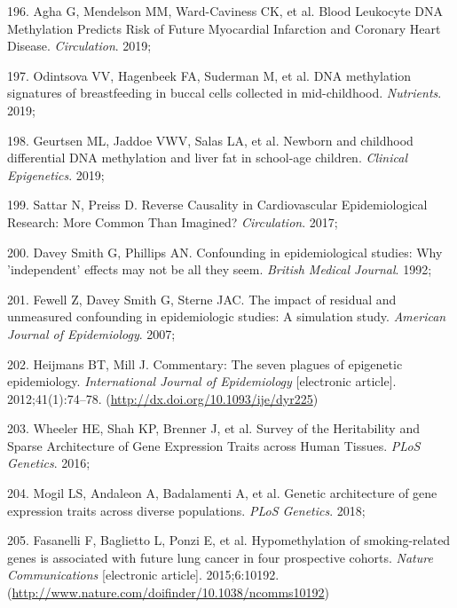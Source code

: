 \documentclass[11pt,oneside]{bristolthesis}
\newenvironment{cslreferences}%
  {}%
  {\par}
\begin{document}
\begin{cslreferences}
\leavevmode\hypertarget{ref-Agha2019}{}%
196. Agha G, Mendelson MM, Ward-Caviness CK, et al. Blood Leukocyte DNA Methylation Predicts Risk of Future Myocardial Infarction and Coronary Heart Disease. \emph{Circulation}. 2019;

\leavevmode\hypertarget{ref-Odintsova2019}{}%
197. Odintsova VV, Hagenbeek FA, Suderman M, et al. DNA methylation signatures of breastfeeding in buccal cells collected in mid-childhood. \emph{Nutrients}. 2019;

\leavevmode\hypertarget{ref-Geurtsen2019}{}%
198. Geurtsen ML, Jaddoe VWV, Salas LA, et al. Newborn and childhood differential DNA methylation and liver fat in school-age children. \emph{Clinical Epigenetics}. 2019;

\leavevmode\hypertarget{ref-Sattar2017}{}%
199. Sattar N, Preiss D. Reverse Causality in Cardiovascular Epidemiological Research: More Common Than Imagined? \emph{Circulation}. 2017;

\leavevmode\hypertarget{ref-DaveySmith1992}{}%
200. Davey Smith G, Phillips AN. Confounding in epidemiological studies: Why 'independent' effects may not be all they seem. \emph{British Medical Journal}. 1992;

\leavevmode\hypertarget{ref-Fewell2007}{}%
201. Fewell Z, Davey Smith G, Sterne JAC. The impact of residual and unmeasured confounding in epidemiologic studies: A simulation study. \emph{American Journal of Epidemiology}. 2007;

\leavevmode\hypertarget{ref-Heijmans2012}{}%
202. Heijmans BT, Mill J. Commentary: The seven plagues of epigenetic epidemiology. \emph{International Journal of Epidemiology} {[}electronic article{]}. 2012;41(1):74--78. (\url{http://dx.doi.org/10.1093/ije/dyr225})

\leavevmode\hypertarget{ref-Wheeler2016}{}%
203. Wheeler HE, Shah KP, Brenner J, et al. Survey of the Heritability and Sparse Architecture of Gene Expression Traits across Human Tissues. \emph{PLoS Genetics}. 2016;

\leavevmode\hypertarget{ref-Mogil2018}{}%
204. Mogil LS, Andaleon A, Badalamenti A, et al. Genetic architecture of gene expression traits across diverse populations. \emph{PLoS Genetics}. 2018;

\leavevmode\hypertarget{ref-Fasanelli2015}{}%
205. Fasanelli F, Baglietto L, Ponzi E, et al. Hypomethylation of smoking-related genes is associated with future lung cancer in four prospective cohorts. \emph{Nature Communications} {[}electronic article{]}. 2015;6:10192. (\url{http://www.nature.com/doifinder/10.1038/ncomms10192})


\end{cslreferences}
\end{document}
